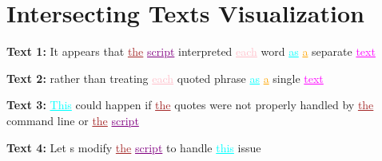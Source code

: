 \documentclass{article}
\begin{document}
\section*{Intersecting Texts Visualization}

\textbf{Text 1:} It appears that \textcolor{brown}{\uline{the}} \textcolor{purple}{\uline{script}} interpreted \textcolor{pink}{\uline{each}} word \textcolor{cyan}{\uline{as}} \textcolor{orange}{\uline{a}} separate \textcolor{magenta}{\uline{text}} 

\textbf{Text 2:} rather than treating \textcolor{pink}{\uline{each}} quoted phrase \textcolor{cyan}{\uline{as}} \textcolor{orange}{\uline{a}} single \textcolor{magenta}{\uline{text}} 

\textbf{Text 3:} \textcolor{cyan}{\uline{This}} could happen if \textcolor{brown}{\uline{the}} quotes were not properly handled by \textcolor{brown}{\uline{the}} command line or \textcolor{brown}{\uline{the}} \textcolor{purple}{\uline{script}} 

\textbf{Text 4:} Let s modify \textcolor{brown}{\uline{the}} \textcolor{purple}{\uline{script}} to handle \textcolor{cyan}{\uline{this}} issue 
\end{document}
